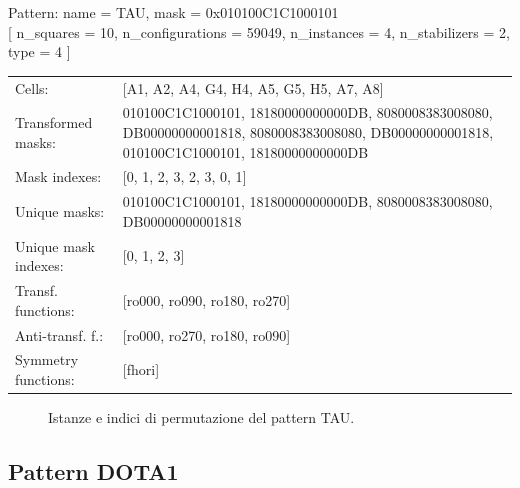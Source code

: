 \begin{tcolorbox}[sharp corners, fontupper=\ttfamily\small, colback=white]
  \noindent Pattern: name = TAU, mask = 0x010100C1C1000101\\
  {[} n\_squares = 10, n\_configurations = 59049,
  n\_instances = 4, n\_stabilizers = 2, type = 4 { ]}\\[1.0ex]
  \begin{tabularx}{\textwidth}{@{} p{3.5cm} X @{}}
    Cells:               & {[}A1, A2, A4, G4, H4, A5, G5, H5, A7, A8{]}\\[0.5ex]
    Transformed masks:   & 010100C1C1000101, 18180000000000DB, 8080008383008080, DB00000000001818, 8080008383008080, DB00000000001818, 010100C1C1000101, 18180000000000DB\\[0.5ex]
    Mask indexes:        & {[}0, 1, 2, 3, 2, 3, 0, 1{]}\\[0.5ex]
    Unique masks:        & 010100C1C1000101, 18180000000000DB, 8080008383008080, DB00000000001818\\[0.5ex]
    Unique mask indexes: & {[}0, 1, 2, 3{]}\\[0.5ex]
    Transf. functions:   & {[}ro000, ro090, ro180, ro270{]}\\[0.5ex]
    Anti-transf. f.:     & {[}ro000, ro270, ro180, ro090{]}\\[0.5ex]
    Symmetry functions:  & {[}fhori{]}\\[0.5ex]
  \end{tabularx}
\end{tcolorbox}

\begin{figure}[htbp]
  \centering
   \hfill
   \hfill
   \hfill
  \vspace{0.3cm}
   \hfill
   \hfill
   \hfill
  \caption{Istanze e indici di permutazione del pattern TAU.}
\end{figure}

\newpage

\subsection{Pattern DOTA1}

